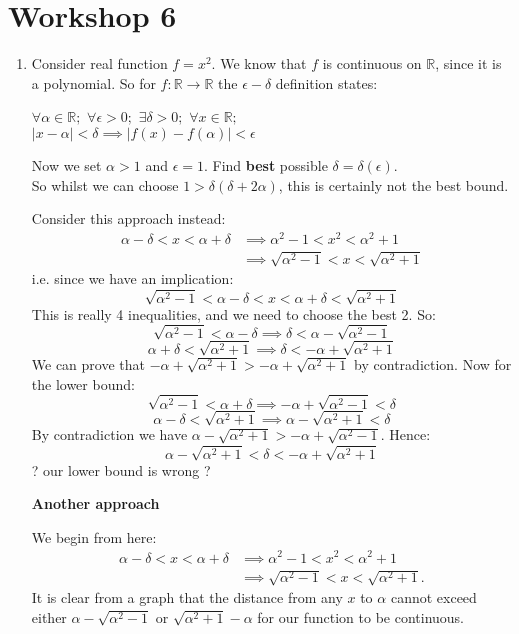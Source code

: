 \pagestyle{fancy}
\fancyhead{}

\section{Workshop 6}
\begin{enumerate}
    \item Consider real function $f=x^2$. We know that $f$ is continuous on $\mathbb{R}$, since it is a polynomial.
    So for $f:\mathbb{R}\rightarrow\mathbb{R}$ the $\epsilon-\delta$ definition states:

    $\forall \alpha \in \mathbb{R};$ $\forall\epsilon>0;$ $\exists\delta>0;$
    $\forall x \in \mathbb{R};$ \\
    $|x-\alpha|<\delta \implies |f(x)-f(\alpha)|<\epsilon$

    Now we set $\alpha>1$ and $\epsilon=1$. Find \textbf{best} possible $\delta = \delta (\epsilon)$. \\

    So whilst we can choose $1>\delta(\delta+2\alpha)$, this is certainly not the best bound.

    Consider this approach instead:
    \begin{align*}
        \alpha-\delta<x<\alpha+\delta &\implies \alpha^2-1<x^2<\alpha^2+1 \\
        &\implies \sqrt{\alpha^2-1}<x<\sqrt{\alpha^2+1}
    \end{align*}
    i.e. since we have an implication:
    $$\sqrt{\alpha^2-1}<\alpha-\delta<x<\alpha+\delta<\sqrt{\alpha^2+1}$$
    This is really 4 inequalities, and we need to choose the best 2. So:
    $$\sqrt{\alpha^2-1}<\alpha-\delta\implies\delta<\alpha-\sqrt{\alpha^2-1}$$
    $$\alpha+\delta<\sqrt{\alpha^2+1}\implies\delta<-\alpha+\sqrt{\alpha^2+1}$$
    We can prove that $-\alpha+\sqrt{\alpha^2+1}>-\alpha+\sqrt{\alpha^2+1}$
    by contradiction. Now for the lower bound:
    $$\sqrt{\alpha^2-1}<\alpha+\delta\implies-\alpha+\sqrt{\alpha^2-1}<\delta$$
    $$\alpha-\delta<\sqrt{\alpha^2+1}\implies\alpha-\sqrt{\alpha^2+1}<\delta$$
    By contradiction we have $\alpha-\sqrt{\alpha^2+1}>-\alpha+\sqrt{\alpha^2-1}$. Hence:
    $$\alpha-\sqrt{\alpha^2+1}<\delta<-\alpha+\sqrt{\alpha^2+1}$$
    ? our lower bound is wrong ?

    \newpage

    \textbf{Another approach}
    
    We begin from here:
    \begin{align*}
        \alpha-\delta<x<\alpha+\delta &\implies \alpha^2-1<x^2<\alpha^2+1 \\
        &\implies \sqrt{\alpha^2-1}<x<\sqrt{\alpha^2+1}.
    \end{align*}
    It is clear from a graph that the distance from any $x$ to $\alpha$ cannot exceed either $\alpha-\sqrt{\alpha^2-1}$ or $\sqrt{\alpha^2+1}-\alpha$ for our function to be continuous.
    \newpage


\end{enumerate}
